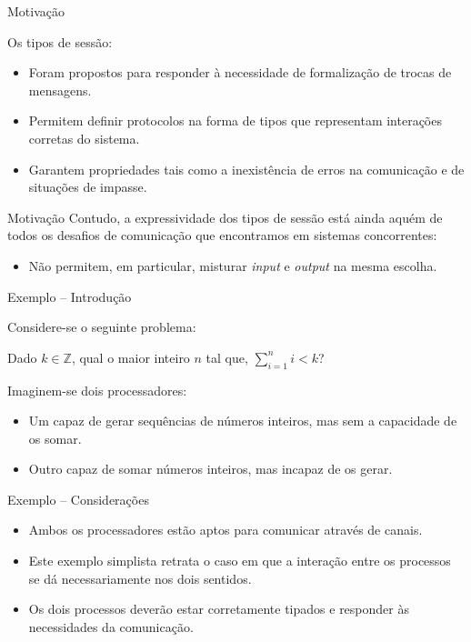 \lstset{language=freest, numbers=none, escapeinside=||}

\begin{frame}[fragile]{Motivação}

  Os tipos de sessão:
  \begin{itemize}
  \item Foram propostos para responder à necessidade de formalização de trocas de mensagens.
    \pause
  \item Permitem definir protocolos na forma de tipos que representam interações corretas do sistema.
    \pause
  \item Garantem propriedades tais como a inexistência de erros na comunicação e de situações de impasse.
  \end{itemize}
\end{frame}

\begin{frame}[fragile]{Motivação}
  Contudo, a expressividade dos tipos de sessão está ainda aquém de todos os desafios de comunicação que encontramos em sistemas concorrentes:
  \vspace{3mm}
  \begin{itemize}
  \item Não permitem, em particular, misturar \textit{input} e \textit{output} na mesma escolha.
  \end{itemize}
\end{frame}

\begin{frame}[fragile]{Exemplo -- Introdução}

  Considere-se o seguinte problema:
  
  Dado $k \in \mathbb{Z}$, qual o maior inteiro $n$ tal que, $\sum_{i=1}^{n} i < k$?
  \pause
  
  Imaginem-se dois processadores:
  \begin{itemize}
  \item Um capaz de gerar sequências de números inteiros, mas sem a capacidade de os somar.
    \pause
  \item Outro capaz de somar números inteiros, mas incapaz de os gerar.
  \end{itemize}  
\end{frame}

\begin{frame}{Exemplo -- Considerações}
  \begin{itemize}
  \item Ambos os processadores estão aptos para comunicar através de canais.
    \vspace*{2mm}
    \pause
  \item Este exemplo simplista retrata o caso em que a interação entre os processos se dá necessariamente nos dois sentidos.
    \vspace*{5mm}
    \pause
  \item Os dois processos deverão estar corretamente tipados e responder às necessidades da comunicação.
  \end{itemize}
\end{frame}

